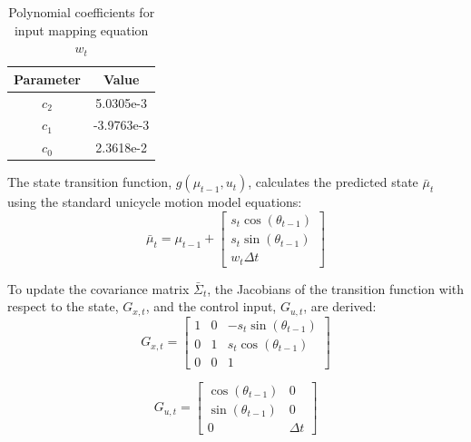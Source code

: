 \documentclass[conference]{IEEEtran}
\begin{document}
\begin{table}[htbp]
\centering
\caption{Polynomial coefficients for input mapping equation $w_t$}
\label{tab:wt_coeffs}
\begin{tabular}{c S}
\toprule
{Parameter} & {Value} \\
\midrule
$c_2$ & 5.0305e-3 \\
$c_1$ & -3.9763e-3 \\
$c_0$ & 2.3618e-2 \\
\bottomrule
\end{tabular}
\end{table}

The state transition function, $g(\mu_{t-1}, u_t)$, calculates the predicted state $\bar{\mu}_t$ using the standard unicycle motion model equations:
\begin{equation}
\bar{\mu}_t = \mu_{t-1} + \begin{bmatrix} s_t \cos(\theta_{t-1}) \\ s_t \sin(\theta_{t-1}) \\ w_t \Delta t \end{bmatrix}
\end{equation}

To update the covariance matrix $\bar{\Sigma}_t$, the Jacobians of the transition function with respect to the state, $G_{x,t}$, and the control input, $G_{u,t}$, are derived:
\begin{equation}
G_{x,t} = \begin{bmatrix} 1 & 0 & -s_t \sin(\theta_{t-1}) \\ 0 & 1 & s_t \cos(\theta_{t-1}) \\ 0 & 0 & 1 \end{bmatrix}
\end{equation}

\begin{equation}
G_{u,t} = \begin{bmatrix} \cos(\theta_{t-1}) & 0 \\ \sin(\theta_{t-1}) & 0 \\ 0 & \Delta t \end{bmatrix}
\end{equation}
\end{document}
